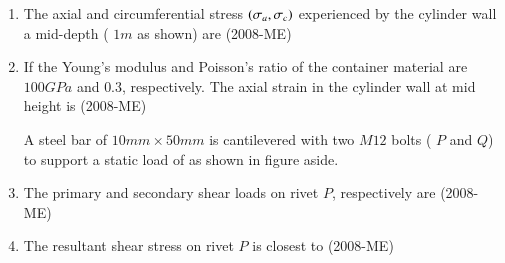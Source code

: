\documentclass[journal]{IEEEtran}
\begin{document}
\begin{enumerate}
  
 \item The axial and circumferential stress $\left(\sigma_a, \sigma_c\right)$ experienced by the cylinder wall a mid-depth (
 $1m$ as shown) are \label{76} \hfill(2008-ME)
\begin{enumerate}
    \end{enumerate}
\item If the Young's modulus and Poisson's ratio of the container material are $100GPa$ and $0.3$, respectively. The axial strain in the cylinder wall at mid height is  \hfill(2008-ME)
\begin{enumerate}
\end{enumerate}

A steel bar of $10mm \times 50mm$
 is cantilevered with two $M12$
 bolts ( $P$ and $Q$) to support a static load of 
 as shown in figure aside.
 
 \item The primary and secondary shear loads on rivet $P$,
 respectively are  \hfill(2008-ME)
 \begin{enumerate}
 \end{enumerate}
 \item The resultant shear stress on rivet $P$
 is closest to  \hfill(2008-ME)
 \begin{enumerate}
 \end{enumerate}


\end{enumerate}
\end{document}
